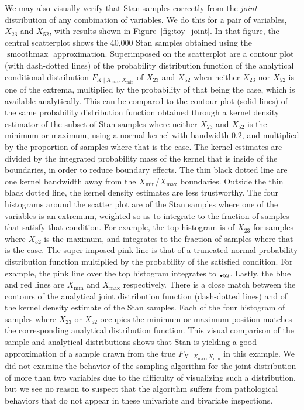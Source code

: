 \documentclass[letter]{article}
\let\Pr\relax
\DeclareMathOperator{\Pr}{\mathbb{P}}
\DeclareMathOperator*{\softmax}{smoothmax}
\newcommand{\Xmax}{X_{\max}}
\newcommand{\Xmin}{X_{\min}}
\newcommand{\Fcond}{F_{X \mid \Xmax,\Xmin}}
\newcommand{\pxx}[2]{\Pr{}_{#1#2}}
\begin{document}
        We may also visually verify that Stan samples correctly from the \emph{joint} distribution of any combination of variables.
We do this for a pair of variables, \(X_{23}\) and \(X_{52}\), with results shown in Figure~\ref{fig:toy_joint}.
In that figure, the central scatterplot shows the 40,000 Stan samples obtained using the \(\softmax\) approximation.
Superimposed on the scatterplot are a contour plot (with dash-dotted lines) of the probability distribution function of the analytical conditional distribution \(\Fcond\) of \(X_{23}\) and \(X_{52}\) when neither \(X_{23}\) nor \(X_{52}\) is one of the extrema, multiplied by the probability of that being the case, which is available analytically.
This can be compared to the contour plot (solid lines) of the same probability distribution function obtained through a kernel density estimator of the subset of Stan samples where neither \(X_{23}\) and \(X_{52}\) is the minimum or maximum,
using a normal kernel with bandwidth \(0.2\),
and multiplied by the proportion of samples where that is the case.
The kernel estimates are divided by the integrated probability mass of the kernel that is inside of the boundaries, in order to reduce boundary effects.
The thin black dotted line are one kernel bandwidth away from the \(\Xmin\)/\(\Xmax\) boundaries.
Outside the thin black dotted line, the kernel density estimates are less trustworthy.
The four histograms around the scatter plot are of the Stan samples where one of the variables is an extremum, weighted so as to integrate to the fraction of samples that satisfy that condition.
For example, the top histogram is of \(X_{23}\) for samples where \(X_{52}\) is the maximum,
and integrates to the fraction of samples where that is the case.
The super-imposed pink line is that of a truncated normal probability distribution function
multiplied by the probability of the satisfied condition.
For example, the pink line over the top histogram integrates to \(\pxx{\bullet}{52}\).
Lastly, the blue and red lines are \(\Xmin\) and \(\Xmax\) respectively.
There is a close match between the contours of the analytical joint distribution function (dash-dotted lines) and of the kernel density estimate of the Stan samples.
Each of the four histogram of samples where \(X_{23}\) or \(X_{52}\) occupies the minimum or maximum position matches the corresponding analytical distribution function.
This visual comparison of the sample and analytical distributions shows that Stan is yielding a good approximation of a sample drawn from the true \(\Fcond\) in this example.
We did not examine the behavior of the sampling algorithm for the joint distribution of more than two variables due to the difficulty of visualizing such a distribution,
but we see no reason to suspect that the algorithm suffers from pathological behaviors that do not appear in these univariate and bivariate inspections.
    
\end{document}
